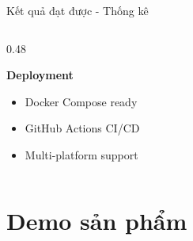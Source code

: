 \documentclass[aspectratio=169,12pt]{beamer}
\begin{document}
\begin{frame}{Kết quả đạt được - Thống kê}
\begin{columns}[T]
\begin{column}{0.48\textwidth}
            \vspace{0.5cm}

            \textbf{ Deployment}
            \begin{itemize}
                \item Docker Compose ready
                \item GitHub Actions CI/CD
                \item Multi-platform support
            \end{itemize}
        \end{column}
    \end{columns}
\end{frame}

\section{Demo sản phẩm}
\end{document}
